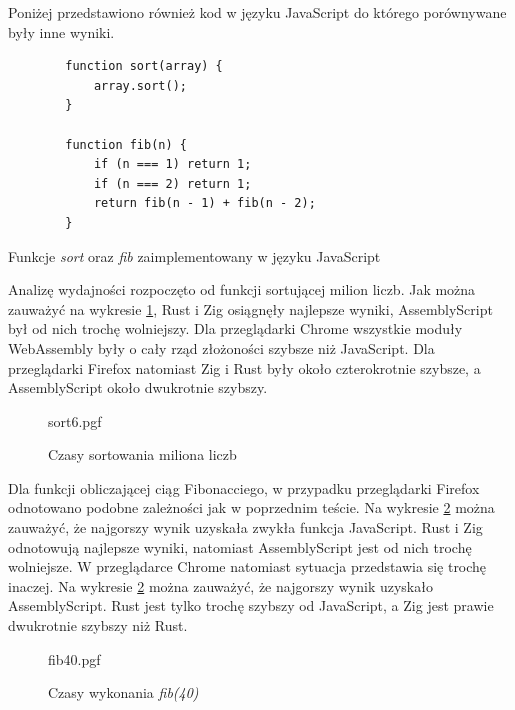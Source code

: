 \documentclass[language=polish,type=master]{aghmodern}
\begin{document}
Poniżej przedstawiono również kod w języku JavaScript do którego porównywane były inne wyniki.

\begin{listing}[H]
    \begin{verbatim}
        function sort(array) {
            array.sort();
        }

        function fib(n) {
            if (n === 1) return 1;
            if (n === 2) return 1;
            return fib(n - 1) + fib(n - 2); 
        }
    \end{verbatim}
    \caption{Funkcje \emph{sort} oraz \emph{fib} zaimplementowany w języku JavaScript}
\end{listing}

Analizę wydajności rozpoczęto od funkcji sortującej milion liczb.
Jak można zauważyć na wykresie \ref{fig:sort6}, Rust i Zig osiągnęły najlepsze wyniki, AssemblyScript był od nich trochę wolniejszy.
Dla przeglądarki Chrome wszystkie moduły WebAssembly były o cały rząd złożoności szybsze niż JavaScript.
Dla przeglądarki Firefox natomiast Zig i Rust były około czterokrotnie szybsze, a AssemblyScript około dwukrotnie szybszy.

\begin{figure}[H]
    \centering
    {sort6.pgf}
    \caption{Czasy sortowania miliona liczb}
    \label{fig:sort6}
\end{figure}

Dla funkcji obliczającej ciąg Fibonacciego, w przypadku przeglądarki Firefox odnotowano podobne zależności jak w poprzednim teście.
Na wykresie \ref{fig:fib40} można zauważyć, że najgorszy wynik uzyskała zwykła funkcja JavaScript.
Rust i Zig odnotowują najlepsze wyniki, natomiast AssemblyScript jest od nich trochę wolniejsze.
W przeglądarce Chrome natomiast sytuacja przedstawia się trochę inaczej.
Na wykresie \ref{fig:fib40} można zauważyć, że najgorszy wynik uzyskało AssemblyScript.
Rust jest tylko trochę szybszy od JavaScript, a Zig jest prawie dwukrotnie szybszy niż Rust.

\begin{figure}[H]
    \centering
    {fib40.pgf}
    \caption{Czasy wykonania \emph{fib(40)}}
    \label{fig:fib40}
\end{figure}
\end{document}
